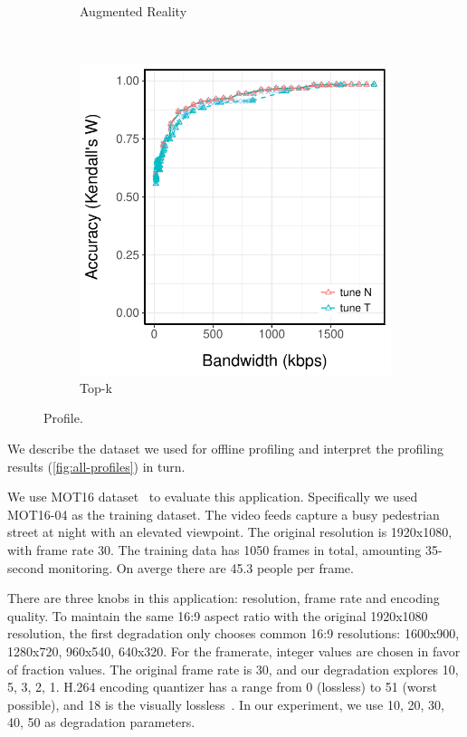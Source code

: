\begin{figure}
\begin{subfigure}[t]{0.30\textwidth}
    \caption{Augmented Reality}
    \label{fig:ar-profile}
  \end{subfigure}
  ~
  \begin{subfigure}[t]{0.30\textwidth}
    \centering
    \includegraphics[width=\textwidth]{figures/log-profile.pdf}
    \caption{Top-k}
    \label{fig:tk-profile}
  \end{subfigure}
  \caption{Profile. }
  \label{fig:all-profiles}
\end{figure}


We describe the dataset we used for offline profiling and interpret the
profiling results (\autoref{fig:all-profiles}) in turn.

 We use MOT16 dataset~\cite{milan2016mot16} to
evaluate this application. Specifically we used MOT16-04 as the training
dataset. The video feeds capture a busy pedestrian street at night with an
elevated viewpoint. The original resolution is 1920x1080, with frame rate
30. The training data has 1050 frames in total, amounting 35-second monitoring.
On averge there are 45.3 people per frame.

There are three knobs in this application: resolution, frame rate and encoding
quality. To maintain the same 16:9 aspect ratio with the original 1920x1080
resolution, the first degradation only chooses common 16:9 resolutions:
1600x900, 1280x720, 960x540, 640x320. For the framerate, integer values are
chosen in favor of fraction values. The original frame rate is 30, and our
degradation explores 10, 5, 3, 2, 1. H.264 encoding quantizer has a range from 0
(lossless) to 51 (worst possible), and 18 is the visually
lossless~\cite{bellard2012ffmpeg}. In our experiment, we use 10, 20, 30, 40, 50
as degradation parameters.

